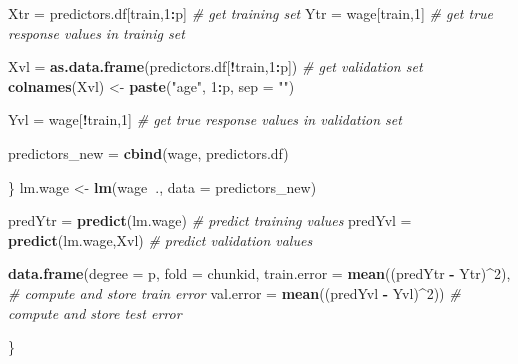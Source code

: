 \documentclass[]{article}
\newenvironment{Shaded}{\begin{snugshade}}{\end{snugshade}}
\newcommand{\KeywordTok}[1]{\textcolor[rgb]{0.13,0.29,0.53}{\textbf{#1}}}
\newcommand{\DataTypeTok}[1]{\textcolor[rgb]{0.13,0.29,0.53}{#1}}
\newcommand{\DecValTok}[1]{\textcolor[rgb]{0.00,0.00,0.81}{#1}}
\newcommand{\StringTok}[1]{\textcolor[rgb]{0.31,0.60,0.02}{#1}}
\newcommand{\CommentTok}[1]{\textcolor[rgb]{0.56,0.35,0.01}{\textit{#1}}}
\newcommand{\OperatorTok}[1]{\textcolor[rgb]{0.81,0.36,0.00}{\textbf{#1}}}
\newcommand{\NormalTok}[1]{#1}
\begin{document}
\begin{Shaded}
\begin{Highlighting}[]
\NormalTok{      Xtr =}\StringTok{ }\NormalTok{predictors.df[train,}\DecValTok{1}\OperatorTok{:}\NormalTok{p]  }\CommentTok{# get training set}
\NormalTok{      Ytr =}\StringTok{ }\NormalTok{wage[train,}\DecValTok{1}\NormalTok{]  }\CommentTok{# get true response values in trainig set}

\NormalTok{      Xvl =}\StringTok{ }\KeywordTok{as.data.frame}\NormalTok{(predictors.df[}\OperatorTok{!}\NormalTok{train,}\DecValTok{1}\OperatorTok{:}\NormalTok{p]) }\CommentTok{# get validation set}
      \KeywordTok{colnames}\NormalTok{(Xvl) <-}\StringTok{ }\KeywordTok{paste}\NormalTok{(}\StringTok{"age"}\NormalTok{, }\DecValTok{1}\OperatorTok{:}\NormalTok{p, }\DataTypeTok{sep =} \StringTok{""}\NormalTok{)}
    
\NormalTok{      Yvl =}\StringTok{ }\NormalTok{wage[}\OperatorTok{!}\NormalTok{train,}\DecValTok{1}\NormalTok{] }\CommentTok{# get true response values in validation set}
      
\NormalTok{      predictors_new =}\StringTok{ }\KeywordTok{cbind}\NormalTok{(wage, predictors.df)}
      
\NormalTok{    \}}
\NormalTok{      lm.wage <-}\StringTok{ }\KeywordTok{lm}\NormalTok{(wage}\OperatorTok{~}\NormalTok{., }\DataTypeTok{data =}\NormalTok{ predictors_new)}
      
\NormalTok{      predYtr =}\StringTok{ }\KeywordTok{predict}\NormalTok{(lm.wage)  }\CommentTok{# predict training values}
\NormalTok{      predYvl =}\StringTok{ }\KeywordTok{predict}\NormalTok{(lm.wage,Xvl)  }\CommentTok{# predict validation values}
 
      \KeywordTok{data.frame}\NormalTok{(}\DataTypeTok{degree =}\NormalTok{ p,}
               \DataTypeTok{fold =}\NormalTok{ chunkid,}
               \DataTypeTok{train.error =} \KeywordTok{mean}\NormalTok{((predYtr }\OperatorTok{-}\StringTok{ }\NormalTok{Ytr)}\OperatorTok{^}\DecValTok{2}\NormalTok{), }\CommentTok{# compute and store train error}
               \DataTypeTok{val.error =} \KeywordTok{mean}\NormalTok{((predYvl }\OperatorTok{-}\StringTok{ }\NormalTok{Yvl)}\OperatorTok{^}\DecValTok{2}\NormalTok{)) }\CommentTok{# compute and store test error}
    

\NormalTok{\}}
\end{Highlighting}
\end{Shaded}
\end{document}
